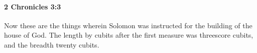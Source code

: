 
		\paragraph{2 Chronicles 3:3} %
			\label{2CHRONICLES-3-3}

			Now these are the things wherein Solomon was instructed for the building of the house of God. The length by cubits after the first measure was threescore cubits, and the breadth twenty cubits.


